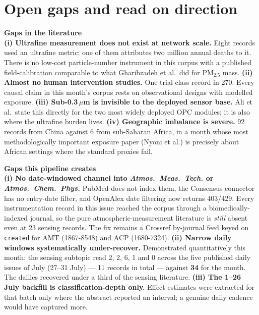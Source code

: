 \documentclass[10pt]{article}
\begin{document}
\section*{\sffamily\bfseries\color{Deep}Open gaps and read on direction}
\vspace{-1.5mm}{\color{Coral}\rule{\linewidth}{1.1pt}}\vspace{2.5mm}

\begin{keybox}
{\sffamily\bfseries\footnotesize\color{Deep}Gaps in the literature}\\[1.2mm]
\footnotesize
\textbf{(i) Ultrafine measurement does not exist at network scale.} Eight records used an
ultrafine metric; one of them attributes two million annual deaths to it. There is no
low-cost particle-number instrument in this corpus with a published field-calibration
comparable to what Gharibzadeh et al.\ did for PM$_{2.5}$ mass.
\textbf{(ii) Almost no human intervention studies.} One trial-class record in 270.
Every causal claim in this month's corpus rests on observational designs with
modelled exposure.
\textbf{(iii) Sub-0.3\,$\mu$m is invisible to the deployed sensor base.} Ali et al.\
state this directly for the two most widely deployed OPC modules; it is also where the
ultrafine burden lives.
\textbf{(iv) Geographic imbalance is severe.} 92 records from China against 6 from
sub-Saharan Africa, in a month whose most methodologically important exposure paper
(Nyoni et al.) is precisely about African settings where the standard proxies fail.
\end{keybox}

\vspace{2.5mm}

\begin{keybox}
{\sffamily\bfseries\footnotesize\color{Deep}Gaps this pipeline creates}\\[1.2mm]
\footnotesize
\textbf{(i) No date-windowed channel into \textit{Atmos.\ Meas.\ Tech.} or
\textit{Atmos.\ Chem.\ Phys.}} PubMed does not index them, the Consensus connector has
no entry-date filter, and OpenAlex date filtering now returns 403/429. Every
instrumentation record in this issue reached the corpus through a
biomedically-indexed journal, so the pure atmospheric-measurement literature is
\emph{still} absent even at 23 sensing records. The fix remains a Crossref by-journal
feed keyed on \texttt{created} for AMT (1867-8548) and ACP (1680-7324).
\textbf{(ii) Narrow daily windows systematically under-recover.} Demonstrated
quantitatively this month: the sensing subtopic read 2, 2, 6, 1 and 0 across the five
published daily issues of July (27--31 July) --- 11 records in total --- against
\textbf{34} for the month. The dailies recovered under a third of the sensing literature.
\textbf{(iii) The 1--26 July backfill is classification-depth only.} Effect estimates
were extracted for that batch only where the abstract reported an interval; a genuine
daily cadence would have captured more.
\end{keybox}
\end{document}
